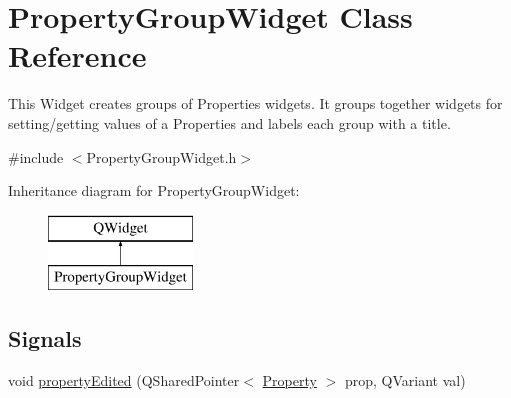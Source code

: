 \hypertarget{class_property_group_widget}{\section{Property\-Group\-Widget Class Reference}
\label{class_property_group_widget}
}


This Widget creates groups of Properties widgets. It groups together widgets for setting/getting values of a Properties and labels each group with a title.  




{\ttfamily \#include $<$Property\-Group\-Widget.\-h$>$}

Inheritance diagram for Property\-Group\-Widget\-:\begin{figure}[H]
\begin{center}
\leavevmode
\includegraphics[height=2.000000cm]{class_property_group_widget}
\end{center}
\end{figure}
\subsection*{Signals}
\begin{DoxyCompactItemize}
\item 
void \hyperlink{class_property_group_widget_ad7ed101c09787429b9b98eb5150f8b8e}{property\-Edited} (Q\-Shared\-Pointer$<$ \hyperlink{class_picto_1_1_property}{Property} $>$ prop, Q\-Variant val)
\end{DoxyCompactItemize}
